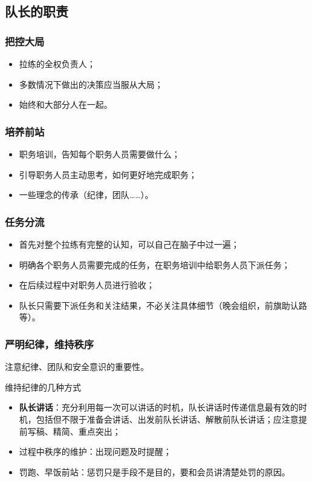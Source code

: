 \documentclass[UTF8]{ctexart}
\begin{document}
\subsection{队长的职责}

\subsubsection{把控大局}
\begin{itemize}[nosep,left=2em]
    \item 拉练的全权负责人；
    \item 多数情况下做出的决策应当服从大局；
    \item 始终和大部分人在一起。
\end{itemize}

\subsubsection{培养前站}
\begin{itemize}[nosep,left=2em]
    \item 职务培训，告知每个职务人员需要做什么；
    \item 引导职务人员主动思考，如何更好地完成职务；
    \item 一些理念的传承（纪律，团队……）。
\end{itemize}

\subsubsection{任务分流}
\begin{itemize}[nosep,left=2em]
    \item 首先对整个拉练有完整的认知，可以自己在脑子中过一遍；
    \item 明确各个职务人员需要完成的任务，在职务培训中给职务人员下派任务；
    \item 在后续过程中对职务人员进行验收；
    \item 队长只需要下派任务和关注结果，不必关注具体细节（晚会组织，前旗助认路等）。
\end{itemize}

\subsubsection{严明纪律，维持秩序}

注意纪律、团队和安全意识的重要性。

维持纪律的几种方式
\begin{itemize}[nosep,left=4em]
    \item \textbf{队长讲话}：充分利用每一次可以讲话的时机，队长讲话时传递信息最有效的时机，包括但不限于准备会讲话、出发前队长讲话、解散前队长讲话；应注意提前写稿、精简、重点突出；
    \item 过程中秩序的维护：出现问题及时提醒；
    \item 罚跑、早饭前站：惩罚只是手段不是目的，要和会员讲清楚处罚的原因。
\end{itemize}
\end{document}
